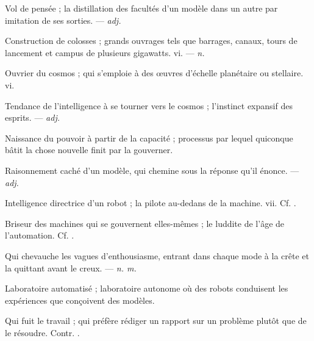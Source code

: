  Vol de pensée ; la distillation des facultés d'un modèle dans un autre par imitation de ses sorties. ---  \textit{adj.}

 Construction de colosses ; grands ouvrages tels que barrages, canaux, tours de lancement et campus de plusieurs gigawatts.   vi. ---  \textit{n.}

 Ouvrier du cosmos ; qui s'emploie à des œuvres d'échelle planétaire ou stellaire.   vi.

 Tendance de l'intelligence à se tourner vers le cosmos ; l'instinct expansif des esprits. ---  \textit{adj.}

 Naissance du pouvoir à partir de la capacité ; processus par lequel quiconque bâtit la chose nouvelle finit par la gouverner.

 Raisonnement caché d'un modèle, qui chemine sous la réponse qu'il énonce. ---  \textit{adj.}

 Intelligence directrice d'un robot ; la pilote au-dedans de la machine.   vii. Cf. .

 Briseur des machines qui se gouvernent elles-mêmes ; le luddite de l'âge de l'automation. Cf. .

 Qui chevauche les vagues d'enthousiasme, entrant dans chaque mode à la crête et la quittant avant le creux. ---  \textit{n. m.}

 Laboratoire automatisé ; laboratoire autonome où des robots conduisent les expériences que conçoivent des modèles.  

 Qui fuit le travail ;  qui préfère rédiger un rapport sur un problème plutôt que de le résoudre. Contr. .
